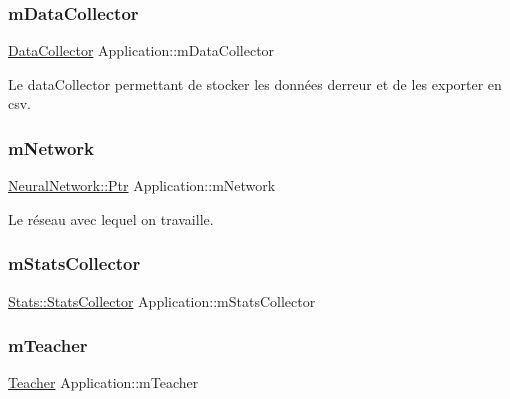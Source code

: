 \subsubsection{\texorpdfstring{m\+Data\+Collector}{mDataCollector}}
{\footnotesize\ttfamily \hyperlink{classDataCollector}{Data\+Collector} Application\+::m\+Data\+Collector\hspace{0.3cm}{\ttfamily [private]}}



Le data\+Collector permettant de stocker les données d\textquotesingle{}erreur et de les exporter en csv. 

\mbox{\label{classApplication_aeec81cfdef16dae6f18bc7da55991e45}} 
\subsubsection{\texorpdfstring{m\+Network}{mNetwork}}
{\footnotesize\ttfamily \hyperlink{classNeuralNetwork_a31de381df65f261fd0f38e0559995d1a}{Neural\+Network\+::\+Ptr} Application\+::m\+Network\hspace{0.3cm}{\ttfamily [private]}}



Le réseau avec lequel on travaille. 

\mbox{\label{classApplication_a33f1c0f13d4c81101bb497264037cb82}} 
\subsubsection{\texorpdfstring{m\+Stats\+Collector}{mStatsCollector}}
{\footnotesize\ttfamily \hyperlink{classStats_1_1StatsCollector}{Stats\+::\+Stats\+Collector} Application\+::m\+Stats\+Collector\hspace{0.3cm}{\ttfamily [private]}}

\mbox{\label{classApplication_aabafc2a40d05198496fed23f6fe1ea1f}} 
\subsubsection{\texorpdfstring{m\+Teacher}{mTeacher}}
{\footnotesize\ttfamily \hyperlink{classTeacher}{Teacher} Application\+::m\+Teacher\hspace{0.3cm}{\ttfamily [private]}}




